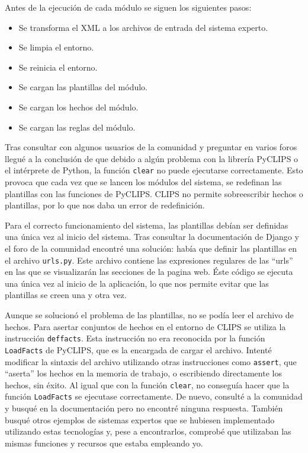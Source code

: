 Antes de la ejecución de cada módulo se siguen los siguientes pasos:

\begin{itemize}
	\item Se transforma el XML a los archivos de entrada del sistema experto.
	\item Se limpia el entorno.
	\item Se reinicia el entorno.
	\item Se cargan las plantillas del módulo.
	\item Se cargan los hechos del módulo.
	\item Se cargan las reglas del módulo.
\end{itemize}

\bigskip

Tras consultar con algunos usuarios de la comunidad y preguntar en varios foros llegué a la conclusión de que debido a algún problema con la librería PyCLIPS o el intérprete de Python, la función \texttt{clear} no puede ejecutarse correctamente. Esto provoca que cada vez que se lancen los módulos del sistema, se redefinan las plantillas con las funciones de PyCLIPS. CLIPS no permite sobreescribir hechos o plantillas, por lo que nos daba un error de redefinición. 

Para el correcto funcionamiento del sistema, las plantillas debían ser definidas una única vez al inicio del sistema. Tras consultar la documentación de Django y el foro de la comunidad encontré una solución: había que definir las plantillas en el archivo \texttt{urls.py}. Este archivo contiene las expresiones regulares de las ``urls'' en las que se visualizarán las secciones de la pagina web. Éste código se ejecuta una única vez al inicio de la aplicación, lo que nos permite evitar que las plantillas se creen una y otra vez.

Aunque se solucionó el problema de las plantillas, no se podía leer el archivo de hechos. Para asertar conjuntos de hechos en el entorno de CLIPS se utiliza la instrucción \texttt{deffacts}. Esta instrucción no era reconocida por la función \texttt{LoadFacts} de PyCLIPS, que es la encargada de cargar el archivo. Intenté modificar la sintaxis del archivo utilizando otras instrucciones como \texttt{assert}, que ``aserta'' los hechos en la memoria de trabajo, o escribiendo directamente los hechos, sin éxito. Al igual que con la función \texttt{clear}, no conseguía hacer que la función \texttt{LoadFacts} se ejecutase correctamente. De nuevo, consulté a la comunidad y busqué en la documentación pero no encontré ninguna respuesta. También busqué otros ejemplos de sistemas expertos que se hubiesen implementado utilizando estas tecnologías y, pese a encontrarlos, comprobé que utilizaban las mismas funciones y recursos que estaba empleando yo.

